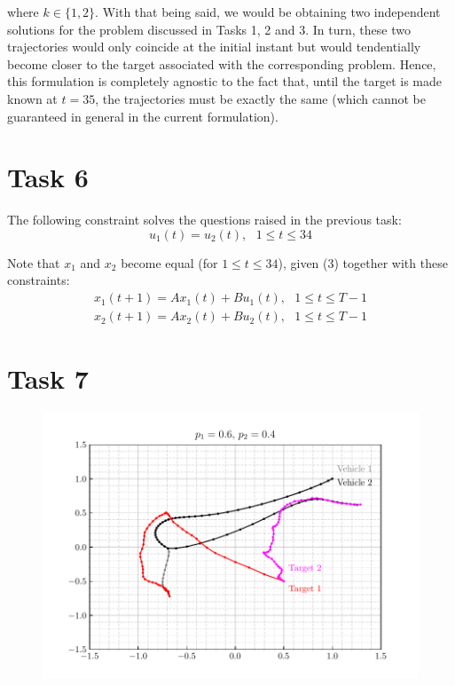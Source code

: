\documentclass[12pt]{article}
\begin{document}
where $k \in \{1, 2\}$. With that being said, we would be obtaining two independent solutions for the problem discussed in Tasks 1, 2 and 3. In turn, these two trajectories would only coincide at the initial instant but would tendentially become closer to the target associated with the corresponding problem. Hence, this formulation is completely agnostic to the fact that, until the target is made known at $t = 35$, the trajectories must be exactly the same (which cannot be guaranteed in general in the current formulation).

\section{Task 6}

The following constraint solves the questions raised in the previous task: \\
\vspace{-0.3em}
\begin{equation}
    \label{equation_t6}
    u_1(t) = u_{2}(t), \> \> \> 1 \le t \le 34
\end{equation}

Note that $x_1$ and $x_2$ become equal (for $1 \le t \le 34$), given (3) together with these constraints: \\
\vspace{-1.6em}
\begin{align*}
    x_1(t+1) = A x_1(t) + B u_1(t), \> \> \> 1 \le t \le T-1 \\
    x_2(t+1) = A x_2(t) + B u_2(t), \> \> \> 1 \le t \le T-1
\end{align*}

\section{Task 7}

\begin{figure}[H]
    \centering
    \includegraphics{../../src/tasks_5-7/output/ex_7.pdf}
\end{figure}
\end{document}

